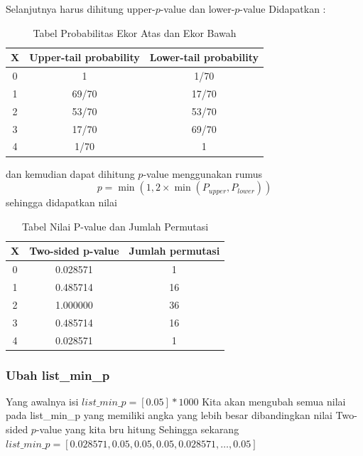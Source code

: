 \documentclass[a4paper,twoside]{article}
\begin{document}
Selanjutnya harus dihitung upper-$p$-value dan lower-$p$-value
Didapatkan :
\begin{table}[h!]
\centering
\begin{tabular}{|c|c|c|}
\hline
\textbf{X} & \textbf{Upper-tail probability} & \textbf{Lower-tail probability} \\ \hline
0          & 1                               & 1/70                            \\ \hline
1          & 69/70                           & 17/70                           \\ \hline
2          & 53/70                           & 53/70                           \\ \hline
3          & 17/70                           & 69/70                           \\ \hline
4          & 1/70                            & 1                               \\ \hline
\end{tabular}
\caption{Tabel Probabilitas Ekor Atas dan Ekor Bawah}
\label{tab:probabilitas}
\end{table}

dan kemudian dapat dihitung $p$-value menggunakan rumus \[ p=\min(1,2\times\min(P_{upper},P_{lower})) \]
sehingga didapatkan nilai 
\begin{table}[h]
\centering
\caption{Tabel Nilai P-value dan Jumlah Permutasi}
\label{tab:permutasi_data2}
\begin{tabular}{ccc}
\hline
\textbf{X} & \textbf{Two-sided p-value} & \textbf{Jumlah permutasi} \\ \hline
0          & 0.028571                   & 1                         \\
1          & 0.485714                   & 16                        \\
2          & 1.000000                   & 36                        \\
3          & 0.485714                   & 16                        \\
4          & 0.028571                   & 1                         \\ \hline
\end{tabular}
\end{table}

\subsubsection{Ubah list\_min\_p}
Yang awalnya isi $list\_min\_p = [0.05] * 1000$
Kita akan mengubah semua nilai pada list\_min\_p yang memiliki angka yang lebih besar dibandingkan nilai Two-sided $p$-value yang kita bru hitung 
Sehingga sekarang $list\_min\_p = [0.028571,0.05,0.05,0.05,0.028571,\ldots,0.05]$
\end{document}
